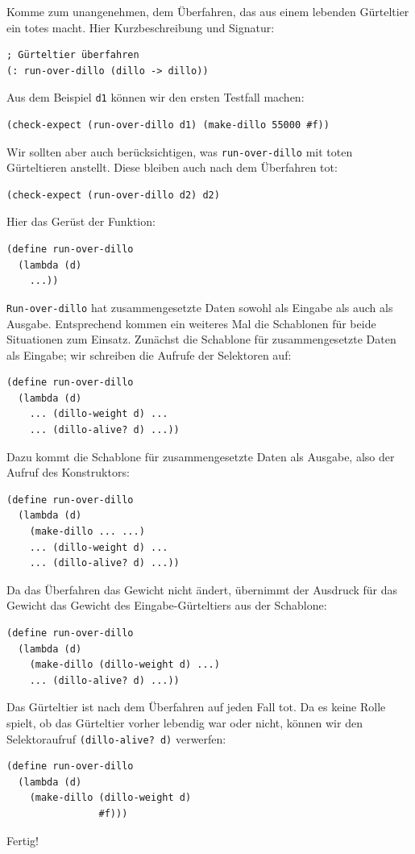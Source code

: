%
Komme zum unangenehmen, dem Überfahren, das aus einem
lebenden Gürteltier ein totes macht.  Hier Kurzbeschreibung und
Signatur:\label{page:run-over-dillo}
%
\begin{verbatim}
; Gürteltier überfahren
(: run-over-dillo (dillo -> dillo))
\end{verbatim}
%
Aus dem Beispiel \texttt{d1} können wir den ersten Testfall machen:
%
\begin{verbatim}
(check-expect (run-over-dillo d1) (make-dillo 55000 #f))
\end{verbatim}
%
Wir sollten aber auch berücksichtigen, was \texttt{run-over-dillo} mit
toten Gürteltieren anstellt.  Diese bleiben auch nach dem Überfahren
tot:
%
\begin{verbatim}
(check-expect (run-over-dillo d2) d2)
\end{verbatim}
%
Hier das Gerüst der Funktion:
%
\begin{verbatim}
(define run-over-dillo
  (lambda (d)
    ...))
\end{verbatim}
%
\texttt{Run-over-dillo} hat zusammengesetzte Daten sowohl als Eingabe
als auch als Ausgabe.  Entsprechend kommen ein weiteres Mal die
Schablonen für beide Situationen zum Einsatz.  Zunächst die Schablone
für zusammengesetzte Daten als Eingabe; wir schreiben die Aufrufe der
Selektoren auf:
%
\begin{verbatim}
(define run-over-dillo
  (lambda (d)
    ... (dillo-weight d) ...
    ... (dillo-alive? d) ...))
\end{verbatim}
%
Dazu kommt die Schablone für zusammengesetzte Daten als Ausgabe, also
der Aufruf des Konstruktors:
%
\begin{verbatim}
(define run-over-dillo
  (lambda (d)
    (make-dillo ... ...)
    ... (dillo-weight d) ...
    ... (dillo-alive? d) ...))
\end{verbatim}
%
  Da das Überfahren das Gewicht nicht ändert, übernimmt
der Ausdruck für das Gewicht das Gewicht des Eingabe-Gürteltiers aus
der Schablone:
%
\begin{verbatim}
(define run-over-dillo
  (lambda (d)
    (make-dillo (dillo-weight d) ...)
    ... (dillo-alive? d) ...))
\end{verbatim}
%
Das Gürteltier ist nach dem Überfahren auf jeden Fall tot.  Da es
keine Rolle spielt, ob das Gürteltier vorher lebendig war oder nicht,
können wir den Selektoraufruf \texttt{(dillo-alive? d)} verwerfen:
%
\begin{verbatim}
(define run-over-dillo
  (lambda (d)
    (make-dillo (dillo-weight d)
                #f)))
\end{verbatim}
%
Fertig!

